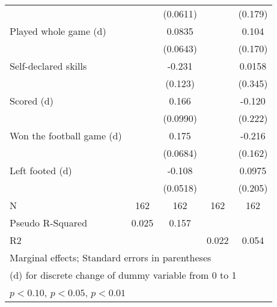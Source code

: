 {\begin{tabular}{l*{4}{c}}
                    &                     &    (0.0611)         &                     &     (0.179)         \\
[1em]
Played whole game (d)&                     &      0.0835         &                     &       0.104         \\
                    &                     &    (0.0643)         &                     &     (0.170)         \\
[1em]
Self-declared skills&                     &      -0.231\sym{*}  &                     &      0.0158         \\
                    &                     &     (0.123)         &                     &     (0.345)         \\
[1em]
Scored (d)          &                     &       0.166\sym{*}  &                     &      -0.120         \\
                    &                     &    (0.0990)         &                     &     (0.222)         \\
[1em]
Won the football game (d)&                     &       0.175\sym{**} &                     &      -0.216         \\
                    &                     &    (0.0684)         &                     &     (0.162)         \\
[1em]
Left footed (d)     &                     &      -0.108\sym{**} &                     &      0.0975         \\
                    &                     &    (0.0518)         &                     &     (0.205)         \\
\hline
N                   &         162         &         162         &         162         &         162         \\
Pseudo R-Squared    &       0.025         &       0.157         &                     &                     \\
R2                  &                     &                     &       0.022         &       0.054         \\
\hline\hline
\multicolumn{5}{l}{\footnotesize Marginal effects; Standard errors in parentheses}\\
\multicolumn{5}{l}{\footnotesize  (d) for discrete change of dummy variable from 0 to 1}\\
\multicolumn{5}{l}{\footnotesize \sym{*} \(p<0.10\), \sym{**} \(p<0.05\), \sym{***} \(p<0.01\)}\\
\end{tabular}
}
